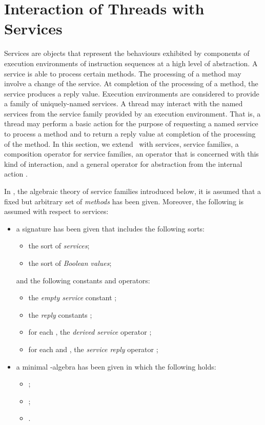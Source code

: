 \documentclass{llncs}
\begin{document}
\section{Interaction of Threads with Services}
\label{sect-TSI}

Services are objects that represent the behaviours exhibited by 
components of execution environments of instruction sequences at a high 
level of abstraction.
A service is able to process certain methods.
The processing of a method may involve a change of the service.
At completion of the processing of a method, the service produces a
reply value.
Execution environments are considered to provide a family of 
uniquely-named services.
A thread may interact with the named services from the service family 
provided by an execution environment.
That is, a thread may perform a basic action for the purpose of 
requesting a named service to process a method and to return a reply 
value at completion of the processing of the method.
In this section, we extend \prBTA\ with services, service families, a 
composition operator for service families, an operator that is 
concerned with this kind of interaction, and a general operator for 
abstraction from the internal action .

In \SFA, the algebraic theory of service families introduced below, it 
is assumed that a fixed but arbitrary set  of \emph{methods} has 
been given.
Moreover, the following is assumed with respect to services:
\begin{itemize}
\item
a signature  has been given that includes the following
sorts:
\begin{itemize}
\item
the sort  of
\emph{services};
\item
the sort  of \emph{Boolean values};
\end{itemize}
and the following constants and operators:
\begin{itemize}
\item
the
\emph{empty service} constant ;
\item
the \emph{reply} constants ;
\item
for each , the
\emph{derived service} operator ;
\item
for each  and , the
\emph{service reply} operator ;
\end{itemize}
\item
a minimal -algebra  has been given in which 
the following holds:
\begin{itemize}
\item
; 
\item
;
\item
.
\end{itemize}
\end{itemize}
\end{document}
